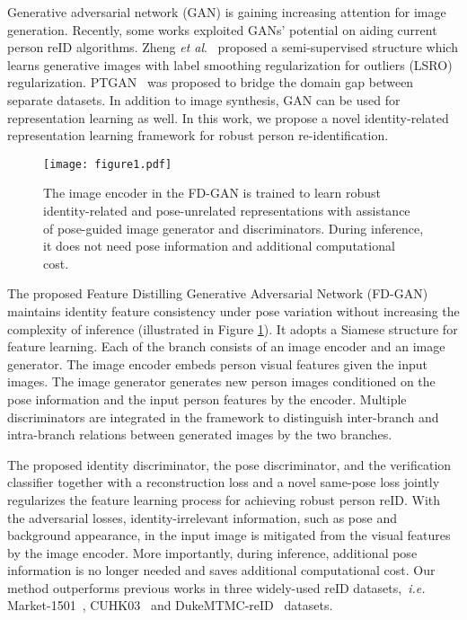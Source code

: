 \documentclass{article}
\newcommand{\etal}{\textit{et al}.}
\begin{document}
Generative adversarial network (GAN) is gaining increasing attention for image generation.
Recently, some works exploited GANs' potential on aiding current person reID algorithms. Zheng \etal~\cite{zheng2017unlabeled} proposed a semi-supervised structure which learns generative images with label smoothing regularization for outliers (LSRO) regularization. 
PTGAN~\cite{wei2017person} was proposed to bridge the domain gap between separate datasets.
In addition to image synthesis, GAN can be used for representation learning as well. 
In this work, we propose a novel identity-related representation learning framework for robust person re-identification.

\begin{figure}[tb] 
\centering
\texttt{[image: figure1.pdf]}
\caption{
The image encoder in the FD-GAN is trained to learn robust identity-related and pose-unrelated representations with assistance of pose-guided image generator and discriminators. During inference, it does not need pose information and additional computational cost.}
\label{fig:first}
\end{figure}

The proposed Feature Distilling Generative Adversarial Network (FD-GAN) maintains identity feature consistency under pose variation without increasing the complexity of inference (illustrated in Figure \ref{fig:first}). 
It adopts a Siamese structure for feature learning. Each of the branch consists of an image encoder and an image generator. The image encoder embeds person visual features given the input images. The image generator generates new person images conditioned on the pose information and the input person features by the encoder. Multiple discriminators are integrated in the framework to distinguish inter-branch and intra-branch relations between generated images by the two branches.

The proposed identity discriminator, the pose discriminator, and the verification classifier together with a reconstruction loss and a novel same-pose loss jointly regularizes the feature learning process for achieving robust person reID.
With the adversarial losses, identity-irrelevant information, such as pose and background appearance, in the input image is mitigated from the visual features by the image encoder.
More importantly, during inference, additional pose information is no longer needed and saves additional computational cost.
Our method outperforms previous works in three widely-used reID datasets,~\textit{i.e.} Market-1501~\cite{market}, CUHK03~\cite{cuhk} and DukeMTMC-reID~\cite{duke} datasets.
\end{document}
